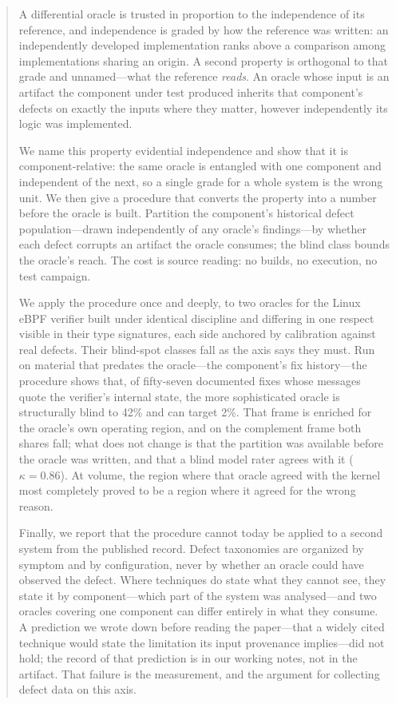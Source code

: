 \documentclass[sigconf,nonacm]{acmart}
\begin{document}
\begin{abstract}
A differential oracle is trusted in proportion to the independence of its reference,
and independence is graded by how the reference was written: an independently
developed implementation ranks above a comparison among implementations sharing an
origin. A second property is orthogonal to that grade and unnamed---what the
reference \emph{reads}. An oracle whose input is an artifact the component under test
produced inherits that component's defects on exactly the inputs where they matter,
however independently its logic was implemented.

We name this property evidential independence and show that it is
component-relative: the same oracle is entangled with one component and independent
of the next, so a single grade for a whole system is the wrong unit. We then give a
procedure that converts the property into a number before the oracle is built.
Partition the component's historical defect population---drawn independently of any
oracle's findings---by whether each defect corrupts an artifact the oracle consumes;
the blind class bounds the oracle's reach. The cost is source reading: no builds,
no execution, no test campaign.

We apply the procedure once and deeply, to two oracles for the Linux eBPF verifier
built under identical discipline and differing in one respect visible in their type
signatures, each side anchored by calibration against real defects. Their blind-spot
classes fall as the axis says they must. Run on material that predates the oracle---the
component's fix history---the procedure shows that, of fifty-seven documented fixes whose messages quote the verifier's internal
state, the more sophisticated oracle is structurally blind to 42\% and can target
2\%. That frame is enriched for the oracle's own operating region, and on the complement
frame both shares fall; what does not change is that the partition was available
before the oracle was written, and that a blind model rater agrees with it
($\kappa = 0.86$). At volume, the
region where that oracle agreed with the kernel most completely proved to be a region
where it agreed for the wrong reason.

Finally, we report that the procedure cannot today be applied to a second system from
the published record. Defect taxonomies are organized by symptom and by
configuration, never by whether an oracle could have observed the defect. Where
techniques do state what they cannot see, they state it by component---which part of
the system was analysed---and two oracles covering one component can differ entirely
in what they consume. A prediction we wrote down before reading the paper---that a widely
cited technique would state the limitation its input provenance implies---did not
hold; the record of that prediction is in our working notes, not in the artifact. That
failure is the measurement, and the argument for collecting defect data on this axis.
\end{abstract}
\end{document}

